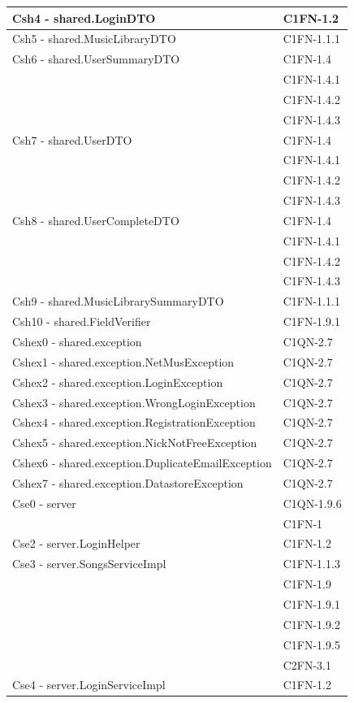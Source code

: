 \begin{footnotesize}
\begin{longtable}[!h]{|l|l|}
Csh4 - shared.LoginDTO & C1FN-1.2 \\\hline
Csh5 - shared.MusicLibraryDTO & C1FN-1.1.1 \\\hline
Csh6 - shared.UserSummaryDTO & C1FN-1.4 \\
& C1FN-1.4.1 \\
& C1FN-1.4.2 \\
& C1FN-1.4.3 \\\hline
Csh7 - shared.UserDTO & C1FN-1.4 \\
& C1FN-1.4.1 \\
& C1FN-1.4.2 \\
& C1FN-1.4.3 \\\hline
Csh8 - shared.UserCompleteDTO & C1FN-1.4 \\
& C1FN-1.4.1 \\
& C1FN-1.4.2 \\
& C1FN-1.4.3 \\\hline
Csh9 - shared.MusicLibrarySummaryDTO &  C1FN-1.1.1 \\\hline
Csh10 - shared.FieldVerifier & C1FN-1.9.1 \\\hline
Cshex0 - shared.exception & C1QN-2.7 \\\hline
Cshex1 - shared.exception.NetMusException & C1QN-2.7 \\\hline
Cshex2 - shared.exception.LoginException & C1QN-2.7 \\\hline
Cshex3 - shared.exception.WrongLoginException & C1QN-2.7 \\\hline
Cshex4 - shared.exception.RegistrationException & C1QN-2.7 \\\hline
Cshex5 - shared.exception.NickNotFreeException & C1QN-2.7 \\\hline
Cshex6 - shared.exception.DuplicateEmailException & C1QN-2.7 \\\hline
Cshex7 - shared.exception.DatastoreException & C1QN-2.7 \\\hline
Cse0 - server & C1QN-1.9.6 \\
&  C1FN-1 \\\hline
Cse2 - server.LoginHelper & C1FN-1.2 \\\hline
Cse3 - server.SongsServiceImpl & C1FN-1.1.3 \\
& C1FN-1.9 \\
& C1FN-1.9.1 \\
& C1FN-1.9.2 \\
& C1FN-1.9.5 \\
& C2FN-3.1 \\\hline
Cse4 - server.LoginServiceImpl & C1FN-1.2 \\\hline

\end{longtable}
\end{footnotesize}

